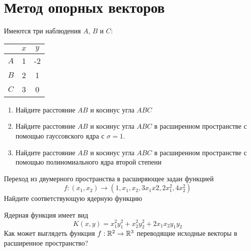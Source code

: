 \documentclass[pdftex,11pt,openany]{book}\usepackage[]{graphicx}\usepackage[]{color}
\begin{document}
\begin{solution}
\end{solution}






\chapter{Метод опорных векторов}


\begin{problem}
Имеются три наблюдения $A$, $B$ и $C$:

\begin{tabular}{ccc}
 & $x$ & $y$ \\ 
\hline 
$A$ & 1 & -2 \\ 
$B$ & 2 & 1 \\ 
$C$ & 3 & 0 \\ 
\end{tabular} 

\begin{enumerate}
\item Найдите расстояние $AB$ и косинус угла $ABC$
\item Найдите расстояние $AB$ и косинус угла $ABC$ в расширенном пространстве с помощью гауссовского ядра с $\sigma=1$.
\item Найдите расстояние $AB$ и косинус угла $ABC$ в расширенном пространстве с помощью полиномиального ядра второй степени
\end{enumerate}
\end{problem}

\begin{solution}
\end{solution}

\begin{problem}
Переход из двумерного пространства в расширяющее задан функцией 
\[
f : (x_1,x_2) \to (1,x_1,x_2,3x_1 x2, 2x_1^2, 4x_2^2)
\]
Найдите соответствующую ядерную функцию
\end{problem}

\begin{solution}
\end{solution}


\begin{problem}
Ядерная функция имеет вид 
\[
K(x,y)=x_1^2y_1^2+x_2^2y_2^2+2x_1x_2y_1y_2
\]
Как может выглядеть функция $f:\mathbb R^2\rightarrow\mathbb R^3$ переводящие исходные векторы в расширенное пространство?
\end{problem}
\end{document}
